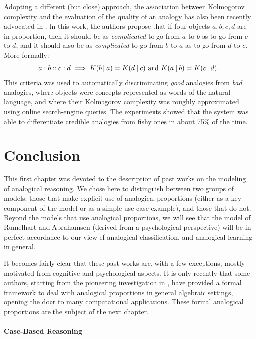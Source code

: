 Adopting a different (but close) approach, the association between Kolmogorov
complexity and the evaluation of the quality of an analogy has also been
recently advocated in \cite{BayPraRic12}. In this work, the authors propose
that if four objects $a, b, c, d$ are in proportion, then it should be as
\textit{complicated} to go from $a$ to $b$ as to go from $c$ to $d$, and it
should also be as \textit{complicated} to go from $b$ to $a$ as to go from $d$
to $c$. More formally:
$$a:b::c:d \implies K(b \:\vert\: a) = K(d \:\vert\: c) \text{ and } K(a \:\vert\: b) =
K(c \:\vert\: d).$$
This criteria was used to automatically discriminating \textit{good} analogies
from \textit{bad} analogies, where objects were concepts represented as words
of the natural language, and where their Kolmogorov complexity was roughly
approximated using online search-engine queries. The experiments showed that
the system was able to differentiate credible analogies from fishy ones in
about 75\% of the time.

\section*{Conclusion}

This first chapter was devoted to the description of past works on the modeling
of analogical reasoning. We chose here to distinguish between two groups of
models: those that make explicit use of analogical proportions (either as a key
component of the model or as a simple use-case example), and those that do not.
Beyond the models that use analogical proportions, we will see that the model
of Rumelhart and Abrahamsen (derived from a psychological perspective) will be
in perfect accordance to our view of analogical classification, and analogical
learning in general.

It becomes fairly clear that these past works are, with a few exceptions,
mostly motivated from cognitive and psychological aspects. It is only recently
that some authors, starting from the pioneering investigation in \cite{Lep04},
have provided a formal framework to deal with analogical proportions in general
algebraic settings, opening the door to many computational applications. These
formal analogical proportions are the subject of the next chapter.



\newpage
\paragraph{Case-Based Reasoning\\}

